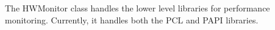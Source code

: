 %



The HWMonitor class handles the lower level libraries for
performance monitoring. Currently, it handles both the PCL
and PAPI libraries.

